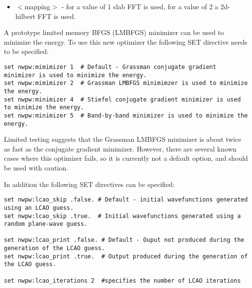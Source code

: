 \begin{itemize}
        \item $<$mapping$>$ - for a value of 1 slab FFT is used, for a value of 2 a 2d-hilbert FFT is used.
\end{itemize}

A prototype limited memory BFGS (LMBFGS) minimizer can be used to minimize the energy.  To
use this new optimizer the following SET directive needs to be specified:
\begin{verbatim}
set nwpw:mimimizer 1  # Default - Grassman conjugate gradient minimizer is used to minimize the energy.
set nwpw:mimimizer 2  # Grassman LMBFGS minimimzer is used to minimize the energy.
set nwpw:minimizer 4  # Stiefel conjugate gradient minimizer is used to minimize the energy. 
set nwpw:minimizer 5  # Band-by-band minimizer is used to minimize the energy.
\end{verbatim}
Limited testing suggests that the Grassman LMBFGS minimizer is about twice as fast as
the conjugate gradient minimizer.  However, there are several known cases
where this optimizer fails, so it is currently not a default option, and
should be used with caution.

In addition the following SET directives can be specified:
\begin{verbatim}
set nwpw:lcao_skip .false. # Default - initial wavefunctions generated using an LCAO guess. 
set nwpw:lcao_skip .true.  # Initial wavefunctions generated using a random plane-wave guess.

set nwpw:lcao_print .false. # Default - Ouput not produced during the generation of the LCAO guess. 
set nwpw:lcao_print .true.  # Output produced during the generation of the LCAO guess.

set nwpw:lcao_iterations 2  #specifies the number of LCAO iterations 
\end{verbatim}


